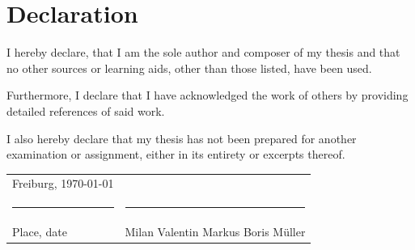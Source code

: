 \begingroup
\setlength{\parindent}{0pt}

\section*{Declaration}

\bigskip
\bigskip
\bigskip

I hereby declare, that I am the sole author and composer of my thesis and
that no other sources or learning aids, other than those listed, have been used.

Furthermore, I declare that I have acknowledged the work of others
by providing detailed references of said work.

I also hereby declare that my thesis has not been prepared
for another examination or assignment, either in its entirety or
excerpts thereof.

\bigskip
\bigskip
\bigskip
\bigskip
\bigskip
\bigskip

\begin{tabular}{p{} l}
  Freiburg, \today             &                              \\
  \rule{\textwidth*2/5}{0.4pt} & \rule{\textwidth*2/5}{0.4pt} \\
  Place, date                  & Milan Valentin Markus Boris Müller
\end{tabular}

\endgroup
